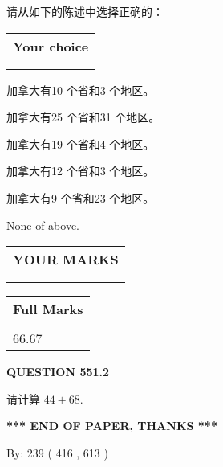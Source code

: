 \documentclass{ctexart}
\begin{document}
  
请从如下的陈述中选择正确的：
  
  
\noindent\hspace{3.0in} \begin{tabular}{|l|}
\hline
Your choice \\
\hline
 \\ 
 \\ 
\hline
\end{tabular}
  
  
 
 
加拿大有10 个省和3 个地区。
 
 
加拿大有25 个省和31 个地区。
 
 
加拿大有19 个省和4 个地区。
 
 
加拿大有12 个省和3 个地区。
 
 
加拿大有9 个省和23 个地区。
 
 
 None of above.
 
 
  
\vspace{0.2in}
  
\noindent\begin{tabular}{|l|}
\hline
 YOUR MARKS  \\
\hline
 \\ 
 \\ 
\hline
\end{tabular}
\hspace{0.05in} \begin{tabular}{|l|}
\hline
 Full Marks  \\
\hline
 \\ 
66.67 \\
\hline
\end{tabular}
{\textbf{\Large{QUESTION
551.2 
}}}
  
  
 
请计算 $ %
44 +  %
68 $.
 

 

 
   
   
 \vspace{0.2in}
 
   
   
   
   
\vspace{1.0in} 
{\textbf{\large{ *** END OF PAPER, THANKS *** }}} 
   
   
\hspace{1.0in} By: 
 239 ( 416 ,  613 )
   
\end{document}
